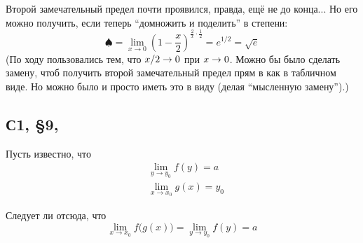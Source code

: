 \documentclass[a4paper,12pt]{article}
\begin{document}
\begin{solution}
    Второй замечательный предел почти проявился, правда, ещё не до конца...
    Но его можно получить, если теперь ``домножить и поделить'' в степени:
    \[
      \spadesuit = \lim_{x \to 0} \left(1 - \frac{x}{2}\right)^{\frac{2}{x} \cdot \frac{1}{2}}
        = e^{1/2} = \sqrt{e}
    \]
    (По ходу пользовались тем, что $x \hm/ 2 \hm\to 0$ при $x \hm\to 0$.
    Можно бы было сделать замену, чтоб получить второй замечательный предел прям в как в табличном виде.
    Но можно было и просто иметь это в виду (делая ``мысленную замену'').)
  \end{solution}


  \subsection{С1, \S 9, }

  Пусть известно, что
  \[
    \begin{aligned}
      &\lim_{y \to y_0} f(y) = a\\
      &\lim_{x \to x_0} g(x) = y_0
    \end{aligned}
  \]

  Следует ли отсюда, что
  \[
    \lim_{x \to x_0} f\bigl(g(x)\bigr) = \lim_{y \to y_0} f(y) = a
  \]
  
\end{document}
